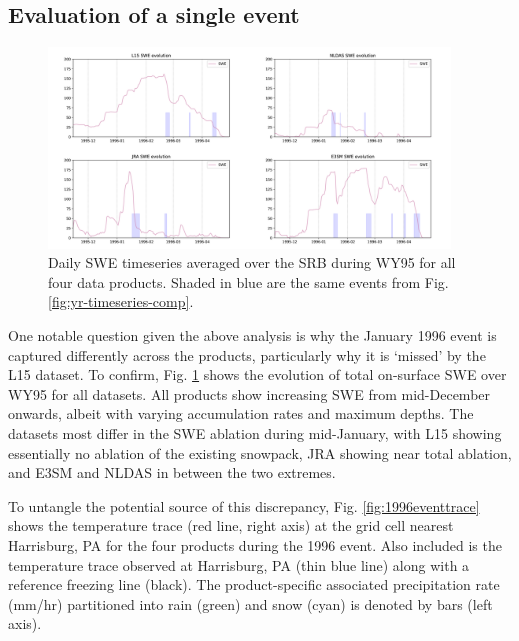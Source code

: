 \documentclass[nhess, manuscript]{copernicus}
\begin{document}
\subsection{Evaluation of a single event}

\begin{figure}
\noindent\includegraphics[width=0.95\textwidth]{figs/cropped/merged_SWE_1995.png}
\caption{Daily SWE timeseries averaged over the SRB during WY95 for all four data products. Shaded in blue are the same events from Fig. \ref{fig:yr-timeseries-comp}.}
\label{fig:allswewy95}
\end{figure}


One notable question given the above analysis is why the January 1996 event is captured differently across the products, particularly why it is `missed' by the L15 dataset.
To confirm, Fig. \ref{fig:allswewy95} shows the evolution of total on-surface SWE over WY95 for all datasets.
All products show increasing SWE from mid-December onwards, albeit with varying accumulation rates and maximum depths.
The datasets most differ in the SWE ablation during mid-January, with L15 showing essentially no ablation of the existing snowpack, JRA showing near total ablation, and E3SM and NLDAS in between the two extremes.

To untangle the potential source of this discrepancy, Fig. \ref{fig:1996eventtrace} shows the temperature trace (red line, right axis) at the grid cell nearest Harrisburg, PA for the four products during the 1996 event.
Also included is the temperature trace observed at Harrisburg, PA (thin blue line) along with a reference freezing line (black).
The product-specific associated precipitation rate (mm/hr) partitioned into rain (green) and snow (cyan) is denoted by bars (left axis).
\end{document}

